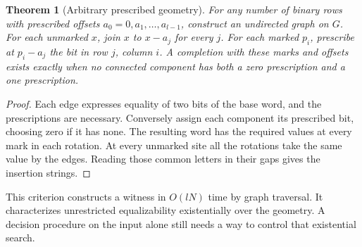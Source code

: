 \documentclass[11pt]{article}
\newtheorem{theorem}{Theorem}[section]
\begin{document}
\begin{theorem}[Arbitrary prescribed geometry]\label{geom}
For any number of binary rows with prescribed offsets $a_0=0,a_1,\ldots,a_{l-1}$, construct an undirected graph on $G$. For each unmarked $x$, join $x$ to $x-a_j$ for every $j$. For each marked $p_i$, prescribe at $p_i-a_j$ the bit in row $j$, column $i$. A completion with these marks and offsets exists exactly when no connected component has both a zero prescription and a one prescription.
\end{theorem}
\begin{proof}
Each edge expresses equality of two bits of the base word, and the prescriptions are necessary. Conversely assign each component its prescribed bit, choosing zero if it has none. The resulting word has the required values at every mark in each rotation. At every unmarked site all the rotations take the same value by the edges. Reading those common letters in their gaps gives the insertion strings.
\end{proof}
This criterion constructs a witness in $O(lN)$ time by graph traversal. It characterizes unrestricted equalizability existentially over the geometry. A decision procedure on the input alone still needs a way to control that existential search.
\end{document}
